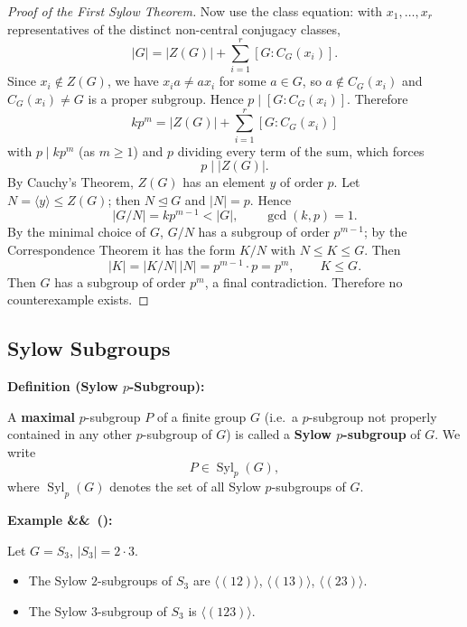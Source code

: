 \documentclass[11pt,a4paper]{article}
\DeclareMathOperator{\Syl}{Syl}
\newenvironment{definition}[1]{
	\begin{definitionbox}
		\textbf{\color{primaryColor}Definition (#1):} 
	}{
	\end{definitionbox}
}
\newcounter{examplecnt}[section]
\newenvironment{example}[1][]{
	\stepcounter{examplecnt}
	\begin{examplebox}
		\textbf{\color{exampleColor}Example \arabic{examplecnt}\ifx&#1&\else\ (#1)\fi:} 
	}{
	\end{examplebox}
}
\begin{document}
\begin{proof}[Proof of the First Sylow Theorem]
		\vspace{0.5em}
		\noindent Now use the class equation: with $x_1, \dots, x_r$ representatives of the distinct non-central conjugacy classes,
		\[
		|G| = |Z(G)| + \sum_{i=1}^{r} [G : C_G(x_i)] .
		\]
		Since $x_i \notin Z(G)$, we have $x_i a \neq a x_i$ for some $a \in G$, so $a \notin C_G(x_i)$ and $C_G(x_i) \neq G$ is a proper subgroup. Hence $p \mid [G : C_G(x_i)]$. Therefore
		\[
		k p^m = |Z(G)| + \sum_{i=1}^{r} [G : C_G(x_i)]
		\]
		with $p \mid k p^m$ (as $m \ge 1$) and $p$ dividing every term of the sum, which forces
		\[
		p \mid |Z(G)| .
		\]
		By Cauchy's Theorem, $Z(G)$ has an element $y$ of order $p$. Let $N = \langle y \rangle \leq Z(G)$; then $N \trianglelefteq G$ and $|N| = p$. Hence
		\[
		|G/N| = k p^{m-1} < |G|, \qquad \gcd(k, p) = 1 .
		\]
		By the minimal choice of $G$, $G/N$ has a subgroup of order $p^{m-1}$; by the Correspondence Theorem it has the form $K/N$ with $N \le K \le G$. Then
		\[
		|K| = |K/N|\,|N| = p^{m-1} \cdot p = p^m, \qquad K \leq G.
		\]
		Then $G$ has a subgroup of order $p^m$, a final contradiction. Therefore no counterexample exists.
	\end{proof}
	
	
	\subsection{Sylow Subgroups}
	
	\begin{definition}{Sylow $p$-Subgroup}
		A \textbf{maximal} $p$-subgroup $P$ of a finite group $G$ (i.e.\ a $p$-subgroup not properly contained in any other $p$-subgroup of $G$) is called a \textbf{Sylow $p$-subgroup} of $G$. We write
		\[
		P \in \Syl_p(G),
		\]
		where $\Syl_p(G)$ denotes the set of all Sylow $p$-subgroups of $G$.
	\end{definition}
	
	\begin{example}
		Let $G = S_3$, $|S_3| = 2 \cdot 3$.
		\begin{itemize}
			\item The Sylow $2$-subgroups of $S_3$ are $\langle (12) \rangle$, $\langle (13) \rangle$, $\langle (23) \rangle$.
			\item The Sylow $3$-subgroup of $S_3$ is $\langle (123) \rangle$.
		\end{itemize}
	\end{example}
	
\end{document}
